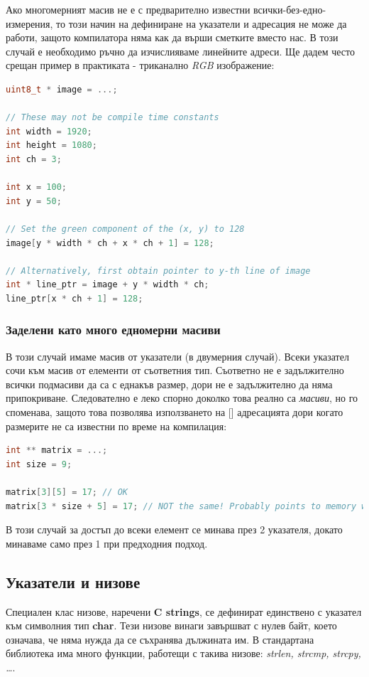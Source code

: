 \documentclass[fleqn,12pt]{article}
\begin{document}
Ако многомерният масив не е с предварително известни всички-без-едно-измерения, то този начин на дефиниране на указатели и адресация
не може да работи, защото компилатора няма как да върши сметките вместо нас. В този случай е необходимо ръчно да изчислияваме линейните адреси.
Ще дадем често срещан пример в практиката - триканално \textit{RGB} изображение:
\begin{lstlisting}[language=C++, caption=Multidimensional pointers]
uint8_t * image = ...;

// These may not be compile time constants
int width = 1920;
int height = 1080;
int ch = 3;

int x = 100;
int y = 50;

// Set the green component of the (x, y) to 128
image[y * width * ch + x * ch + 1] = 128;

// Alternatively, first obtain pointer to y-th line of image
int * line_ptr = image + y * width * ch;
line_ptr[x * ch + 1] = 128;
\end{lstlisting}

\subsubsection{Заделени като много едномерни масиви}
В този случай имаме масив от указатели (в двумерния случай). Всеки указател сочи към масив от елементи от съответния тип.
Съответно не е задължително всички подмасиви да са с еднакъв размер, дори не е задължително да няма припокриване.
Следователно е леко спорно доколко това реално са \textit{масиви}, но го споменава, защото това позволява използването
на [] адресацията дори когато размерите не са известни по време на компилация:

\begin{lstlisting}[language=C++, caption=Multidimensional pointers 2]
int ** matrix = ...;
int size = 9;

matrix[3][5] = 17; // OK
matrix[3 * size + 5] = 17; // NOT the same! Probably points to memory we shouldn't touch
\end{lstlisting}

В този случай за достъп до всеки елемент се минава през 2 указателя, докато минаваме само през 1 при предходния подход.

\subsection{Указатели и низове}
Специален клас низове, наречени \textbf{C strings}, се дефинират единствено с указател към символния тип \textbf{char}.
Тези низове винаги завършват с нулев байт, което означава, че няма нужда да се съхранява дължината им.
В стандартана библиотека има много функции, работещи с такива низове: \textit{strlen, strcmp, strcpy, \dots}.
\end{document}
